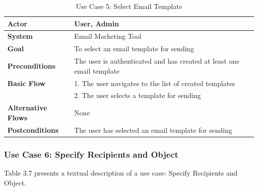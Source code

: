 \begin{table}[ht]
	\centering
	\begin{tabularx}{\textwidth}{|l|X|}
		\hline
		\textbf{Actor}             & User, Admin                                                           \\
		\hline
		\textbf{System}            & Email Marketing Tool                                                  \\
		\hline
		\textbf{Goal}              & To select an email template for sending                               \\
		\hline
		\textbf{Preconditions}     & The user is authenticated and has created at least one email template \\
		\hline
		\textbf{Basic Flow}        & 1. The user navigates to the list of created templates                \\
		                           & 2. The user selects a template for sending                            \\
		\hline
		\textbf{Alternative Flows} & None                                                                  \\
		\hline
		\textbf{Postconditions}    & The user has selected an email template for sending                   \\
		\hline
	\end{tabularx}
	\caption{Use Case 5: Select Email Template}
	\label{tab:Use Case 5 Select Email Template}
\end{table}

\subsubsection{Use Case 6: Specify Recipients and Object}

Table 3.7 presents a textual description of a use case: Specify Recipients and Object.

